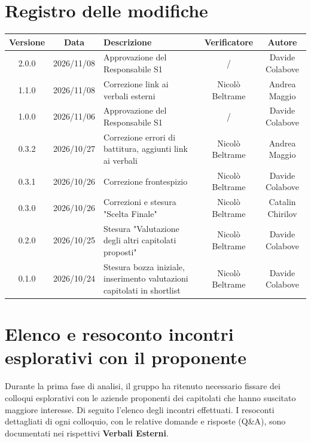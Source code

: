 \documentclass[a4paper, 11pt]{article}
\begin{document}
\section*{Registro delle modifiche}
{\renewcommand{\arraystretch}{1.5}
\begin{tabularx}{\textwidth}{|c|c|X|c|c|}
    \hline
    \textbf{Versione} & \textbf{Data} & \textbf{Descrizione} & \textbf{Verificatore} & \textbf{Autore} \\ \hline
    2.0.0 & 2026/11/08 & Approvazione del Responsabile S1 & / & Davide Colabove \\ \hline
    1.1.0 & 2026/11/08 & Correzione link ai verbali esterni & Nicolò Beltrame & Andrea Maggio \\ \hline
    1.0.0 & 2026/11/06 & Approvazione del Responsabile S1 & / & Davide Colabove \\ \hline
    0.3.2 & 2026/10/27 & Correzione errori di battitura, aggiunti link ai verbali & Nicolò Beltrame & Andrea Maggio \\ \hline
    0.3.1 & 2026/10/26 & Correzione frontespizio & Nicolò Beltrame & Davide Colabove \\ \hline
    0.3.0 & 2026/10/26 & Correzioni e stesura "Scelta Finale" & Nicolò Beltrame & Catalin Chirilov \\ \hline
    0.2.0 & 2026/10/25 & Stesura "Valutazione degli altri capitolati proposti" & Nicolò Beltrame & Davide Colabove \\ \hline
    0.1.0 & 2026/10/24 & Stesura bozza iniziale, inserimento valutazioni capitolati in shortlist & Nicolò Beltrame & Davide Colabove\\ \hline
\end{tabularx}}

\newpage
\tableofcontents
\newpage

\section{Elenco e resoconto incontri esplorativi con il proponente}

Durante la prima fase di analisi, il gruppo ha ritenuto necessario fissare dei colloqui esplorativi con le aziende proponenti dei capitolati che hanno suscitato maggiore interesse. Di seguito l'elenco degli incontri effettuati. I resoconti dettagliati di ogni colloquio, con le relative domande e risposte (Q\&A), sono documentati nei rispettivi \textbf{Verbali Esterni}.
\end{document}
